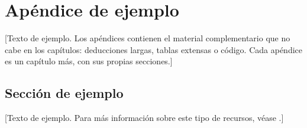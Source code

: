 \chapter{Apéndice de ejemplo}\label{ape:ejemplo}

[Texto de ejemplo. Los apéndices contienen el material complementario que
no cabe en los capítulos: deducciones largas, tablas extensas o código.
Cada apéndice es un capítulo más, con sus propias secciones.]

\section{Sección de ejemplo}

[Texto de ejemplo. Para más información sobre este tipo de recursos, véase
\cite{sitio-ejemplo}.]
